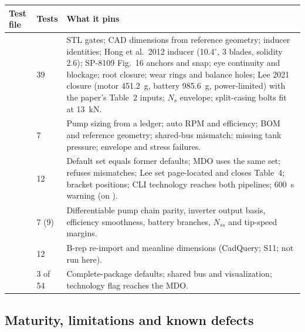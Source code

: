 {\small
\begin{longtable}{@{}P{4.0cm}P{1.5cm}P{10.7cm}@{}}
\toprule
\textbf{Test file} & \textbf{Tests} & \textbf{What it pins} \\
\midrule
\endhead
{} & 39 & STL gates; CAD dimensions from reference geometry; inducer identities; Hong et al.\ 2012 inducer (10.4$^\circ$, 3 blades, solidity 2.6); SP-8109 Fig.~16 anchors and snap; eye continuity and blockage; root closure; wear rings and balance holes; Lee 2021 closure (motor 451.2~g, battery 985.6~g, power-limited) with the paper's Table~2 inputs; $N_s$ envelope; split-casing bolts fit at 13~kN. \\
 & 7 & Pump sizing from a ledger; auto RPM and efficiency; BOM and reference geometry; shared-bus mismatch; missing tank pressure; envelope and stress failures. \\
 & 12 & Default set equals former defaults; MDO uses the same set;  refuses mismatches; Lee set page-located and closes Table~4; bracket positions; CLI technology reaches both pipelines; 600~s warning (on ). \\
 & 7 (9) & Differentiable pump chain parity, inverter output basis, efficiency smoothness, battery branches, $N_{ss}$ and tip-speed margins. \\
 & 12 & B-rep re-import and meanline dimensions (CadQuery; S11; not run here). \\
 & 3 of 54 & Complete-package defaults; shared bus and visualization; technology flag reaches the MDO. \\
\bottomrule
\end{longtable}}

\subsection{Maturity, limitations and known defects}

